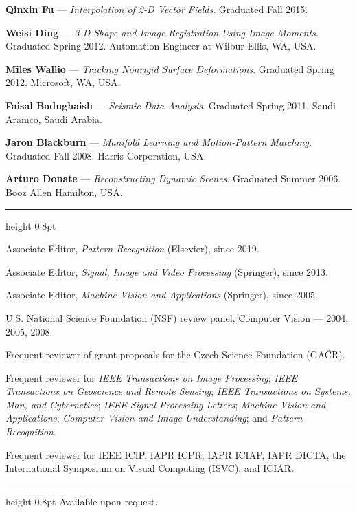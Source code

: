 \documentclass[11pt]{article}
\newcommand{\cvsection}[1]{%
  \vspace{12pt}%
  {\normalfont\large\scshape\textls[120]{#1}}\par
  \vspace{2pt}\hrule height 0.8pt\vspace{7pt}}
\newcommand{\cvsubsection}[1]{%
  \vspace{6pt}{\normalfont\scshape #1}\par\vspace{3pt}}
\begin{document}
\begin{cvitems}
  \item \textbf{Qinxin Fu} --- \textit{Interpolation of 2-D Vector Fields}. Graduated Fall 2015.
  \item \textbf{Weisi Ding} --- \textit{3-D Shape and Image Registration Using Image Moments}. Graduated Spring 2012. Automation Engineer at Wilbur-Ellis, WA, USA.
  \item \textbf{Miles Wallio} --- \textit{Tracking Nonrigid Surface Deformations}. Graduated Spring 2012. Microsoft, WA, USA.
  \item \textbf{Faisal Badughaish} --- \textit{Seismic Data Analysis}. Graduated Spring 2011. Saudi Aramco, Saudi Arabia.
  \item \textbf{Jaron Blackburn} --- \textit{Manifold Learning and Motion-Pattern Matching}. Graduated Fall 2008. Harris Corporation, USA.
  \item \textbf{Arturo Donate} --- \textit{Reconstructing Dynamic Scenes}. Graduated Summer 2006. Booz Allen Hamilton, USA.
\end{cvitems}

\cvsection{Professional Service}
\cvsubsection{Journal Editorial Boards}
\begin{cvitems}
  \item Associate Editor, \textit{Pattern Recognition} (Elsevier), since 2019.
  \item Associate Editor, \textit{Signal, Image and Video Processing} (Springer), since 2013.
  \item Associate Editor, \textit{Machine Vision and Applications} (Springer), since 2005.
\end{cvitems}
\vspace{4pt}
\cvsubsection{Grant-Proposal Review}
\begin{cvitems}
  \item U.S. National Science Foundation (NSF) review panel, Computer Vision --- 2004, 2005, 2008.
  \item Frequent reviewer of grant proposals for the Czech Science Foundation (GA\v{C}R).
\end{cvitems}
\vspace{4pt}
\cvsubsection{Journal Reviewing}
Frequent reviewer for \textit{IEEE Transactions on Image Processing}; \textit{IEEE Transactions on
Geoscience and Remote Sensing}; \textit{IEEE Transactions on Systems, Man, and Cybernetics};
\textit{IEEE Signal Processing Letters}; \textit{Machine Vision and Applications}; \textit{Computer
Vision and Image Understanding}; and \textit{Pattern Recognition}.\par
\vspace{4pt}
\cvsubsection{Conference Reviewing}
Frequent reviewer for IEEE ICIP, IAPR ICPR, IAPR ICIAP, IAPR DICTA, the International Symposium
on Visual Computing (ISVC), and ICIAR.\par

\cvsection{References}
Available upon request.
\end{document}
